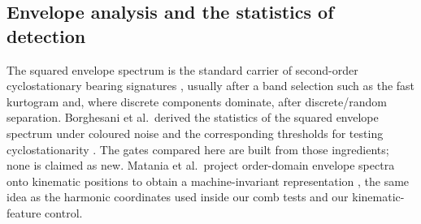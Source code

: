 \subsection{Envelope analysis and the statistics of detection}

The squared envelope spectrum is the standard carrier of second-order cyclostationary bearing signatures \cite{randall2011},
usually after a band selection such as the fast kurtogram \cite{antoni2007kurtogram} and, where discrete components
dominate, after discrete/random separation. Borghesani et al.\ derived the statistics of the squared envelope spectrum under
coloured noise and the corresponding thresholds for testing cyclostationarity \cite{borghesani2013}. The gates compared here
are built from those ingredients; none is claimed as new. Matania et al.\ project order-domain envelope spectra onto
kinematic positions to obtain a machine-invariant representation \cite{matania2025}, the same idea as the harmonic
coordinates used inside our comb tests and our kinematic-feature control.
